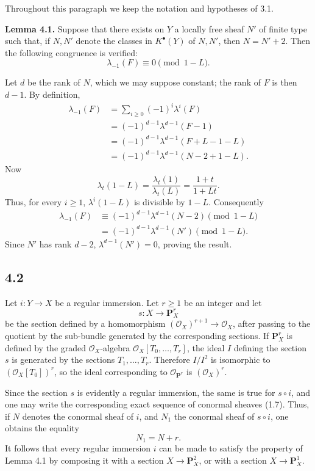 \documentclass[11pt]{article}
\begin{document}
Throughout this paragraph we keep the notation and hypotheses of 3.1.

\textbf{Lemma 4.1.} Suppose that there exists on \(Y\) a locally free sheaf \(N'\) of finite type such that, if \(N,N'\) denote the classes in \(K^\bullet(Y)\) of \(N,N'\), then \(N=N'+2\). Then the following congruence is verified:
\[
  \lambda_{-1}(F)\equiv 0 \pmod{1-L}.
\]

Let \(d\) be the rank of \(N\), which we may suppose constant; the rank of \(F\) is then \(d-1\). By definition,
\[
\begin{aligned}
\lambda_{-1}(F)
 &= \sum_{i\ge0}(-1)^i\lambda^i(F)\\
 &= (-1)^{d-1}\lambda^{d-1}(F-1)\\
 &= (-1)^{d-1}\lambda^{d-1}(F+L-1-L)\\
 &= (-1)^{d-1}\lambda^{d-1}(N-2+1-L).
\end{aligned}
\]
Now
\[
  \lambda_t(1-L)=\frac{\lambda_t(1)}{\lambda_t(L)}
  =\frac{1+t}{1+Lt}.
\]
Thus, for every \(i\ge1\), \(\lambda^i(1-L)\) is divisible by \(1-L\). Consequently
\[
\begin{aligned}
\lambda_{-1}(F)
  &\equiv (-1)^{d-1}\lambda^{d-1}(N-2) \pmod{1-L}\\
  &=(-1)^{d-1}\lambda^{d-1}(N') \pmod{1-L}.
\end{aligned}
\]
Since \(N'\) has rank \(d-2\), \(\lambda^{d-1}(N')=0\), proving the result.

\subsection*{4.2}

Let \(i:Y\to X\) be a regular immersion. Let \(r\ge1\) be an integer and let
\[
  s:X\longrightarrow \mathbf P_X^r
\]
be the section defined by a homomorphism \((\mathcal O_X)^{r+1}\to\mathcal O_X\), after passing to the quotient by the sub-bundle generated by the corresponding sections. If \(\mathbf P_X^r\) is defined by the graded \(\mathcal O_X\)-algebra \(\mathcal O_X[T_0,\ldots,T_r]\), the ideal \(I\) defining the section \(s\) is generated by the sections \(T_1,\ldots,T_r\). Therefore \(I/I^2\) is isomorphic to \((\mathcal O_X[T_0])^r\), so the ideal corresponding to \(\mathcal O_{\mathbf P^r}\) is \((\mathcal O_X)^r\).

Since the section \(s\) is evidently a regular immersion, the same is true for \(s\circ i\), and one may write the corresponding exact sequence of conormal sheaves (1.7). Thus, if \(N\) denotes the conormal sheaf of \(i\), and \(N_1\) the conormal sheaf of \(s\circ i\), one obtains the equality
\[
  N_1=N+r.
\]
It follows that every regular immersion \(i\) can be made to satisfy the property of Lemma 4.1 by composing it with a section \(X\to\mathbf P_X^2\), or with a section \(X\to\mathbf P_X^1\).
\end{document}
